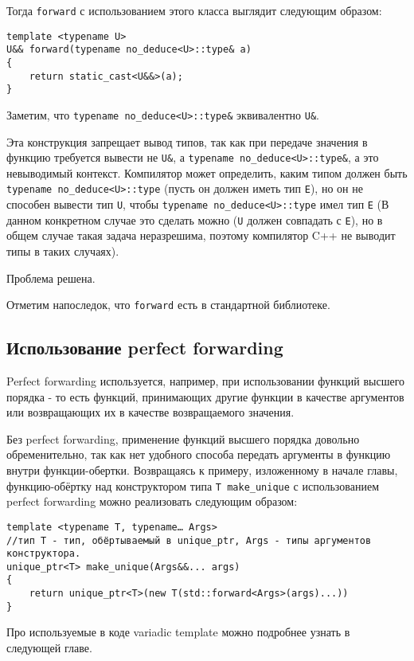 Тогда \texttt{forward} с использованием этого класса выглядит следующим образом:

\begin{verbatim}
template <typename U>
U&& forward(typename no_deduce<U>::type& a)
{
	return static_cast<U&&>(a);
}
\end{verbatim}

Заметим, что \texttt{typename no_deduce<U>::type&} эквивалентно \texttt{U&}.

Эта конструкция запрещает вывод типов, так как при передаче значения в функцию требуется вывести не \texttt{U&}, а \texttt{typename no_deduce<U>::type&}, а это невыводимый контекст. Компилятор может определить, каким типом должен быть \texttt{typename no_deduce<U>::type} (пусть он должен иметь тип \texttt{E}), но он не способен вывести тип \texttt{U}, чтобы \texttt{typename no_deduce<U>::type} имел тип \texttt{E} (В данном конкретном случае это сделать можно (\texttt{U} должен совпадать с \texttt{E}), но в общем случае такая задача неразрешима, поэтому компилятор C++ не выводит типы в таких случаях).

Проблема решена.

Отметим напоследок, что \texttt{forward} есть в стандартной библиотеке.

\subsection{Использование perfect forwarding}

Perfect forwarding используется, например, при использовании функций высшего порядка - то есть функций, принимающих другие функции в качестве аргументов или возвращающих их в качестве возвращаемого значения.

Без perfect forwarding, применение функций высшего порядка довольно обременительно, так как нет удобного способа передать аргументы в функцию внутри функции-обертки.
Возвращаясь к примеру, изложенному в начале главы, функцию-обёртку над конструктором типа \texttt{T make_unique} с использованием perfect forwarding  можно реализовать следующим образом:

\begin{verbatim}
template <typename T, typename… Args>
//тип T - тип, обёртываемый в unique_ptr, Args - типы аргументов конструктора.
unique_ptr<T> make_unique(Args&&... args)
{
	return unique_ptr<T>(new T(std::forward<Args>(args)...))
}
\end{verbatim}

Про используемые в коде variadic template можно подробнее узнать в следующей главе.
